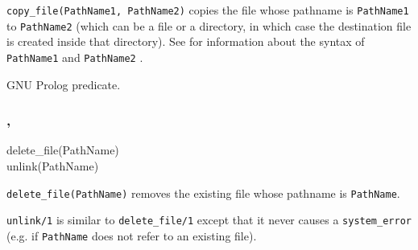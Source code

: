 \Description

\texttt{copy\_file(PathName1, PathName2)} copies the file whose
pathname is \texttt{PathName1} to \texttt{PathName2} (which can be a
file or a directory, in which case the destination file is created
inside that directory). See  for
information about the syntax of \texttt{PathName1} and
\texttt{PathName2} .

\begin{PlErrors}








\end{PlErrors}

\Portability

GNU Prolog predicate.

\subsubsection{,
               }

\begin{TemplatesOneCol}
delete\_file(PathName)\\
unlink(PathName)

\end{TemplatesOneCol}

\Description

\texttt{delete\_file(PathName)} removes the existing file whose pathname is
\texttt{PathName}.

\texttt{unlink/1} is similar to \texttt{delete\_file/1} except that it never
causes a \texttt{system\_error} (e.g. if \texttt{PathName} does not refer to
an existing file).

